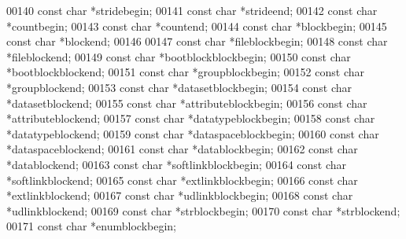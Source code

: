\begin{DoxyCode}
{00140     \textcolor{keyword}{const} \textcolor{keywordtype}{char} *stridebegin;
00141     \textcolor{keyword}{const} \textcolor{keywordtype}{char} *strideend;
00142     \textcolor{keyword}{const} \textcolor{keywordtype}{char} *countbegin;
00143     \textcolor{keyword}{const} \textcolor{keywordtype}{char} *countend;
00144     \textcolor{keyword}{const} \textcolor{keywordtype}{char} *blockbegin;
00145     \textcolor{keyword}{const} \textcolor{keywordtype}{char} *blockend;
00146 
00147     \textcolor{keyword}{const} \textcolor{keywordtype}{char} *fileblockbegin;
00148     \textcolor{keyword}{const} \textcolor{keywordtype}{char} *fileblockend;
00149     \textcolor{keyword}{const} \textcolor{keywordtype}{char} *bootblockblockbegin;
00150     \textcolor{keyword}{const} \textcolor{keywordtype}{char} *bootblockblockend;
00151     \textcolor{keyword}{const} \textcolor{keywordtype}{char} *groupblockbegin;
00152     \textcolor{keyword}{const} \textcolor{keywordtype}{char} *groupblockend;
00153     \textcolor{keyword}{const} \textcolor{keywordtype}{char} *datasetblockbegin;
00154     \textcolor{keyword}{const} \textcolor{keywordtype}{char} *datasetblockend;
00155     \textcolor{keyword}{const} \textcolor{keywordtype}{char} *attributeblockbegin;
00156     \textcolor{keyword}{const} \textcolor{keywordtype}{char} *attributeblockend;
00157     \textcolor{keyword}{const} \textcolor{keywordtype}{char} *datatypeblockbegin;
00158     \textcolor{keyword}{const} \textcolor{keywordtype}{char} *datatypeblockend;
00159     \textcolor{keyword}{const} \textcolor{keywordtype}{char} *dataspaceblockbegin;
00160     \textcolor{keyword}{const} \textcolor{keywordtype}{char} *dataspaceblockend;
00161     \textcolor{keyword}{const} \textcolor{keywordtype}{char} *datablockbegin;
00162     \textcolor{keyword}{const} \textcolor{keywordtype}{char} *datablockend;
00163     \textcolor{keyword}{const} \textcolor{keywordtype}{char} *softlinkblockbegin;
00164     \textcolor{keyword}{const} \textcolor{keywordtype}{char} *softlinkblockend;
00165     \textcolor{keyword}{const} \textcolor{keywordtype}{char} *extlinkblockbegin;
00166     \textcolor{keyword}{const} \textcolor{keywordtype}{char} *extlinkblockend;
00167     \textcolor{keyword}{const} \textcolor{keywordtype}{char} *udlinkblockbegin;
00168     \textcolor{keyword}{const} \textcolor{keywordtype}{char} *udlinkblockend;
00169     \textcolor{keyword}{const} \textcolor{keywordtype}{char} *strblockbegin;
00170     \textcolor{keyword}{const} \textcolor{keywordtype}{char} *strblockend;
00171     \textcolor{keyword}{const} \textcolor{keywordtype}{char} *enumblockbegin;
}
\end{DoxyCode}
